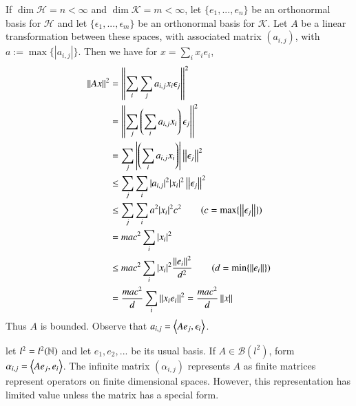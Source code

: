 \begin{eg}
    If $\dim \mathscr{H} = n <\infty$ and $\dim \mathscr{K} = m < \infty$, let $\{e_1,...,e_n\}$ be an orthonormal basis for $\mathscr{H}$ and let $\{\epsilon_1,...,\epsilon_m\}$ be an orthonormal basis for $\mathscr{K}$. Let $A$ be a linear transformation between these spaces, with associated matrix $(a_{i,j})$, with $a := \max\{|a_{i,j}|\}$. Then we have for $x = \sum_ix_ie_i$, \begin{align*}
        \norm{Ax}^2 &= \norm{\sum_i\sum_ja_{i,j}x_i\epsilon_j}^2 \\
        &= \norm{\sum_j\left(\sum_ia_{i,j}x_i\right)\epsilon_j}^2 \\
        &= \sum_j\left|\left(\sum_ia_{i,j}x_i\right)\right|\norm{\epsilon_j}^2 \\
        &\leq \sum_j\sum_i|a_{i,j}|^2|x_i|^2\norm{\epsilon_j}^2 \\
        &\leq \sum_j\sum_ia^2|x_i|^2c^2 \tag{$c = \max\{\norm{\epsilon_j}\}$} \\
        &= mac^2\sum_i|x_i|^2 \\
        &\leq mac^2\sum_i|x_i|^2\frac{\norm{e_i}^2}{d^2}\tag{$d = \min\{\norm{e_i}\}$} \\
        &= \frac{mac^2}{d}\sum_i\norm{x_ie_i}^2 = \frac{mac^2}{d}\norm{x} 
    \end{align*}
    Thus $A$ is bounded. Observe that $a_{i,j} = \left\langle Ae_j, \epsilon_i\right\rangle$.
\end{eg}

\begin{eg}
    let $l^2 = l^2(\mathbb N)$ and let $e_1,e_2,...$ be its usual basis. If $A \in \mathscr{B}(l^2)$, form $\alpha_{i,j} = \left\langle Ae_j, e_i\right\rangle$. The infinite matrix $(\alpha_{i,j})$ represents $A$ as finite matrices represent operators on finite dimensional spaces. However, this representation has limited value unless the matrix has a special form.
\end{eg}

